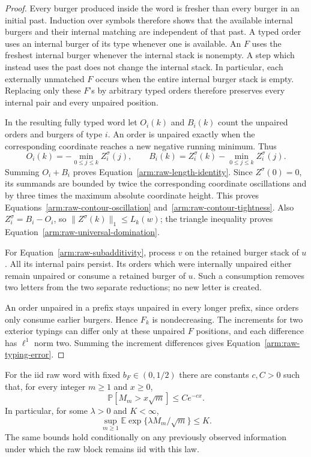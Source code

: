 \begin{proof}
Every burger produced inside the word is fresher than every burger in
an initial past.  Induction over symbols therefore shows that the
available internal burgers and their internal matching are independent
of that past.  A typed order uses an internal burger of its type whenever
one is available.  An $F$ uses the freshest internal burger whenever the
internal stack is nonempty.  A step which instead uses the past does not
change the internal stack.  In particular, each externally unmatched
$F$ occurs when the entire internal burger stack is empty.  Replacing
only these $F$'s by arbitrary typed orders therefore preserves every
internal pair and every unpaired position.

In the resulting fully typed word let $O_i(k)$ and $B_i(k)$ count the
unpaired orders and burgers of type $i$.  An order is unpaired exactly
when the corresponding coordinate reaches a new negative running
minimum.  Thus
\[
 O_i(k)=-\min_{0\le j\le k}Z_i^\sigma(j),\qquad
 B_i(k)=Z_i^\sigma(k)-\min_{0\le j\le k}Z_i^\sigma(j).
\]
Summing $O_i+B_i$ proves
Equation~\eqref{arm:raw-length-identity}.
Since $Z^\sigma(0)=0$, its summands are bounded by twice the
corresponding coordinate oscillations and by three times the maximum
absolute coordinate height.  This proves
Equations~\eqref{arm:raw-contour-oscillation}
and~\eqref{arm:raw-contour-tightness}.
Also $Z_i^\sigma=B_i-O_i$, so
$\|Z^\sigma(k)\|_1\le L_k(w)$; the triangle inequality proves
Equation~\eqref{arm:raw-universal-domination}.

For Equation~\eqref{arm:raw-subadditivity}, process $v$ on the retained
burger stack of $u$.  All its internal pairs persist.  Its orders which
were internally unpaired either remain unpaired or consume a retained
burger of $u$.  Such a consumption removes two letters from the two
separate reductions; no new letter is created.

An order unpaired in a prefix stays unpaired in every longer prefix,
since orders only consume earlier burgers.  Hence $F_k$ is
nondecreasing.  The increments for two exterior typings can differ
only at these unpaired $F$ positions, and each difference has
$\ell^1$ norm two.  Summing the increment differences gives
Equation~\eqref{arm:raw-typing-error}.
\end{proof}

\begin{proposition}
\label{arm:raw-exponential}
For the iid raw word with fixed $b_F\in(0,1/2)$ there are constants
$c,C>0$ such that, for every integer $m\ge1$ and $x\ge0$,
\begin{equation}
\label{arm:raw-exponential-tail}
 \mathbb P[M_m>x\sqrt m]\le Ce^{-cx}.
\end{equation}
In particular, for some $\lambda>0$ and $K<\infty$,
\begin{equation}
\label{arm:raw-exponential-moment}
 \sup_{m\ge1}\mathbb E\exp\{\lambda M_m/\sqrt m\}\le K.
\end{equation}
The same bounds hold conditionally on any previously observed
information under which the raw block remains iid with this law.
\end{proposition}

